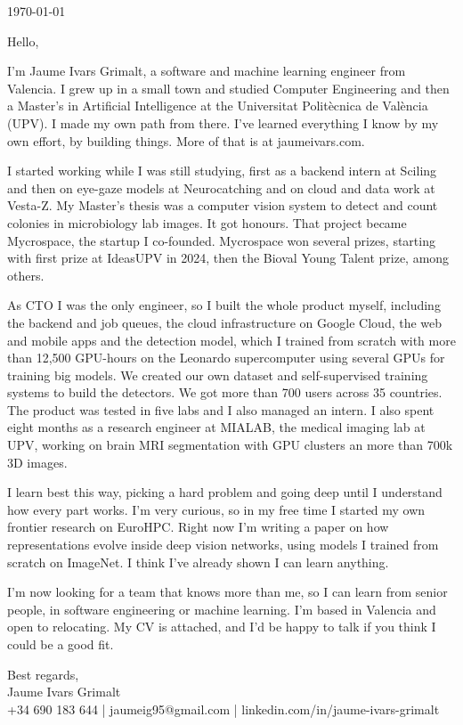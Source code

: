 \documentclass[11pt, a4paper]{../awesome-cv}
\begin{document}
\pagestyle{empty}
\makecvheader[C]

\vspace{8mm}

\bodyfont
\fontsize{11pt}{14.6pt}\selectfont
\color{text}
\setlength{\parskip}{0.72\baselineskip}
\setlength{\parindent}{0pt}

{\color{graytext}\today\par}

Hello,

I'm Jaume Ivars Grimalt, a software and machine learning engineer from Valencia. I grew up in a small town and studied Computer Engineering and then a Master's in Artificial Intelligence at the Universitat Politècnica de València (UPV). I made my own path from there. I've learned everything I know by my own effort, by building things. More of that is at jaumeivars.com.

I started working while I was still studying, first as a backend intern at Sciling and then on eye-gaze models at Neurocatching and on cloud and data work at Vesta-Z. My Master's thesis was a computer vision system to detect and count colonies in microbiology lab images. It got honours. That project became Mycrospace, the startup I co-founded. Mycrospace won several prizes, starting with first prize at IdeasUPV in 2024, then the Bioval Young Talent prize, among others.

As CTO I was the only engineer, so I built the whole product myself, including the backend and job queues, the cloud infrastructure on Google Cloud, the web and mobile apps and the detection model, which I trained from scratch with more than 12,500 GPU-hours on the Leonardo supercomputer using several GPUs for training big models. We created our own dataset and self-supervised training systems to build the detectors. We got more than 700 users across 35 countries. The product was tested in five labs and I also managed an intern. I also spent eight months as a research engineer at MIALAB, the medical imaging lab at UPV, working on brain MRI segmentation with GPU clusters an more than 700k 3D images.

I learn best this way, picking a hard problem and going deep until I understand how every part works. I'm very curious, so in my free time I started my own frontier research on EuroHPC. Right now I'm writing a paper on how representations evolve inside deep vision networks, using models I trained from scratch on ImageNet. I think I've already shown I can learn anything.

I'm now looking for a team that knows more than me, so I can learn from senior people, in software engineering or machine learning. I'm based in Valencia and open to relocating. My CV is attached, and I'd be happy to talk if you think I could be a good fit.

Best regards,\\
Jaume Ivars Grimalt\\
+34 690 183 644 | jaumeig95@gmail.com | linkedin.com/in/jaume-ivars-grimalt
\end{document}
